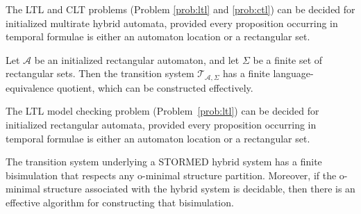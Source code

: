 \begin{cor}
The LTL and CLT problems (Problem \ref{prob:ltl} and \ref{prob:ctl}) can be decided for initialized multirate hybrid automata, provided every proposition occurring in temporal formulae is either an automaton location or a rectangular set.
\end{cor}

\begin{thm}
Let $\mathcal{A}$ be an initialized rectangular automaton, and let $\Sigma$ be a finite set of rectangular sets. Then the transition system $\mathcal{T}_{\mathcal{A},\Sigma}$ has a finite language-equivalence quotient, which can be constructed effectively.
\end{thm}

\begin{cor}
The LTL model checking problem (Problem~\ref{prob:ltl}) can be decided for initialized rectangular automata, provided every proposition occurring in temporal formulae is either an automaton location or a rectangular set.
\end{cor}

\begin{thm}
The transition system underlying a STORMED hybrid system has a finite bisimulation that respects any o-minimal structure partition. Moreover, if the o-minimal structure associated with the hybrid system is decidable, then there is an effective algorithm for constructing that bisimulation.
\end{thm}

